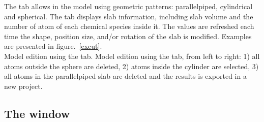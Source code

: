 The  tab allows in the model using geometric patterns: parallelpiped, cylindrical and spherical. 
The  tab displays slab information, including slab volume and the number of atom of each chemical species inside it. 
The values are refreshed each time the shape, position size, and/or rotation of the slab is modified. 
Examples are presented in figure.~\ref{excut}. \\
{Model edition using the  tab.}
{Model edition using the  tab, from left to right: 1) all atoms outside the sphere are deleted, 2) atoms inside the cylinder are selected, 3) all atoms in the parallelpiped slab are deleted and the results is exported in a new project.}

\subsection{The  window}
\label{medial}

